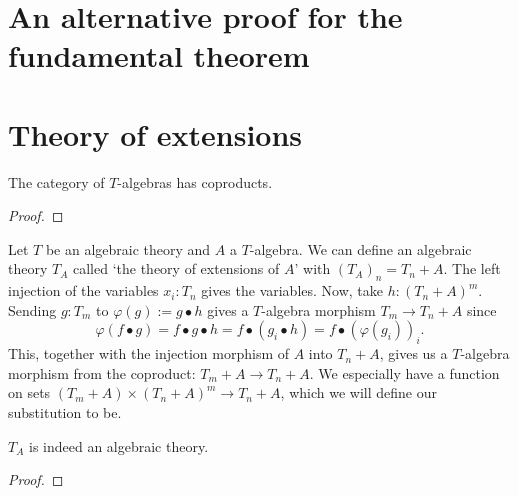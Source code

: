 \section{An alternative proof for the fundamental theorem}


\section{Theory of extensions}

\begin{lemma}
  The category of $ T $-algebras has coproducts.
\end{lemma}
\begin{proof}
  \TODO
\end{proof}

\begin{definition}
  Let $ T $ be an algebraic theory and $ A $ a $ T $-algebra. We can define an algebraic theory $ T_A $ called `the theory of extensions of $ A $' with $ (T_A)_n = T_n + A $. The left injection of the variables $ x_i : T_n $ gives the variables.
  Now, take $ h: (T_n + A)^m $. Sending $ g: T_m $ to $ \varphi(g) := g \bullet h $ gives a $ T $-algebra morphism $ T_m \to T_n + A $ since
  \[ \varphi(f \bullet g) = f \bullet g \bullet h = f \bullet (g_i \bullet h) = f \bullet (\varphi(g_i))_i. \]
  This, together with the injection morphism of $ A $ into $ T_n + A $, gives us a $ T $-algebra morphism from the coproduct: $ T_m + A \to T_n + A $. We especially have a function on sets $ (T_m + A) \times (T_n + A)^m \to T_n + A $, which we will define our substitution to be.
\end{definition}

\begin{lemma}
  $ T_A $ is indeed an algebraic theory.
\end{lemma}
\begin{proof}
  \TODO
\end{proof}
